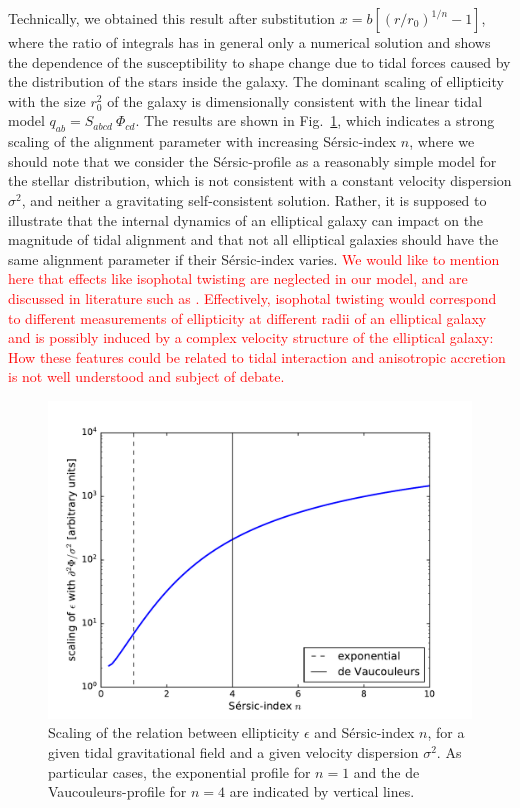 \documentclass[a4paper,fleqn,usenatbib]{mnras}
\newcommand\spirou[1]{\textcolor{red}{#1}}
\begin{document}
Technically, we obtained this result after substitution $x = b\left[(r/r_0)^{1/n}-1\right]$, where the ratio of integrals has in general only a numerical solution and shows the dependence of the susceptibility to shape change due to tidal forces caused by the distribution of the stars inside the galaxy. The dominant scaling of ellipticity with the size $r_0^2$ of the galaxy is dimensionally consistent with the linear tidal model $q_{ab} = S_{abcd}\:\Phi_{cd}$. The results are shown in Fig.~\ref{fig_sersic_scaling}, which indicates a strong scaling of the alignment parameter with increasing S{\'e}rsic-index $n$, where we should note that we consider the S{\'e}rsic-profile as a reasonably simple model for the stellar distribution, which is not consistent with a constant velocity dispersion $\sigma^2$, and neither a gravitating self-consistent solution. Rather, it is supposed to illustrate that the internal dynamics of an elliptical galaxy can impact on the magnitude of tidal alignment and that not all elliptical galaxies should have the same alignment parameter if their S{\'e}rsic-index varies. \spirou{We would like to mention here that effects like isophotal twisting are neglected in our model, and are discussed in literature such as \cite{Singh:2014kla}. Effectively, isophotal twisting would correspond to different measurements of ellipticity at different radii of an elliptical galaxy and is possibly induced by a complex velocity structure of the elliptical galaxy: How these features could be related to tidal interaction and anisotropic accretion is not well understood and subject of debate.}

\begin{figure}
\centering
\includegraphics[scale=0.45]{./figures/sersic_scaling.pdf}
\caption{Scaling of the relation between ellipticity $\epsilon$ and S{\'e}rsic-index $n$, for a given tidal gravitational field and a given velocity dispersion $\sigma^2$. As particular cases, the exponential profile for $n=1$ and the de Vaucouleurs-profile for $n=4$ are indicated by vertical lines.}
\label{fig_sersic_scaling}
\end{figure}
\end{document}
